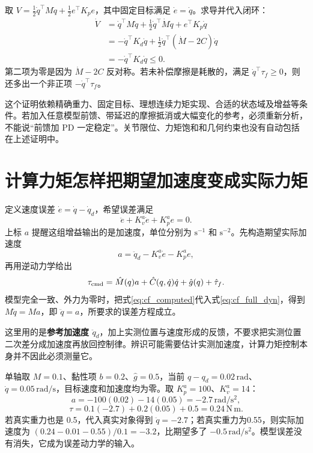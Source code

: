 取 $V=\tfrac12\dot q^\top M\dot q+\tfrac12 e^\top K_pe$，其中固定目标满足 $\dot e=\dot q$。求导并代入闭环：
\begin{align}
\dot V
&=\dot q^\top M\ddot q+\tfrac12\dot q^\top\dot M\dot q
+e^\top K_p\dot q\\
&=-\dot q^\top K_d\dot q
+\tfrac12\dot q^\top(\dot M-2C)\dot q\\
&=-\dot q^\top K_d\dot q\le0.
\end{align}
第二项为零是因为 $\dot M-2C$ 反对称。若未补偿摩擦是耗散的，满足 $\dot q^\top\tau_f\ge0$，则还多出一个非正项 $-\dot q^\top\tau_f$。

这个证明依赖精确重力、固定目标、理想连续力矩实现、合适的状态域及增益等条件。若加入任意模型前馈、带延迟的摩擦抵消或大幅变化的参考，必须重新分析，不能说“前馈加 PD 一定稳定”。关节限位、力矩饱和和几何约束也没有自动包括在上述证明中。

\section{计算力矩怎样把期望加速度变成实际力矩}

定义速度误差 $\dot e=\dot q-\dot q_d$，希望误差满足
\[
\ddot e+K_v^a\dot e+K_p^a e=0.
\]
上标 $a$ 提醒这组增益输出的是加速度，单位分别为 $\mathrm{s^{-1}}$ 和 $\mathrm{s^{-2}}$。先构造期望实际加速度
\[
a=\ddot q_d-K_v^a\dot e-K_p^a e,
\]
再用逆动力学给出
\begin{equation}
\tau_{\rm cmd}=\hat M(q)a+\hat C(q,\dot q)\dot q
+\hat g(q)+\hat\tau_f.
\label{eq:cf_computed}
\end{equation}
模型完全一致、外力为零时，把式\eqref{eq:cf_computed}代入式\eqref{eq:cf_full_dyn}，得到 $M\ddot q=Ma$，即 $\ddot q=a$，所要求的误差方程成立。

这里用的是\textbf{参考加速度 $\ddot q_d$}，加上实测位置与速度形成的反馈，不要求把实测位置二次差分成加速度再放回控制律。辨识可能需要估计实测加速度，计算力矩控制本身并不因此必须测量它。

\begin{examplebox}[算例 15B 计算一次模型控制力矩]
单轴取 $M=0.1$、黏性项 $b=0.2$、$\hat g=0.5$，当前 $q-q_d=0.02\,\mathrm{rad}$、$\dot q=0.05\,\mathrm{rad/s}$，目标速度和加速度均为零。取 $K_p^a=100$、$K_v^a=14$：
\[
a=-100(0.02)-14(0.05)=-2.7\,\mathrm{rad/s^2},
\]
\[
\tau=0.1(-2.7)+0.2(0.05)+0.5=0.24\,\mathrm{N\,m}.
\]
若真实重力也是 0.5，代入真实对象得到 $\ddot q=-2.7$；若真实重力为0.55，则实际加速度为 $(0.24-0.01-0.55)/0.1=-3.2$，比期望多了 $-0.5\,\mathrm{rad/s^2}$。模型误差没有消失，它成为误差动力学的输入。
\end{examplebox}

